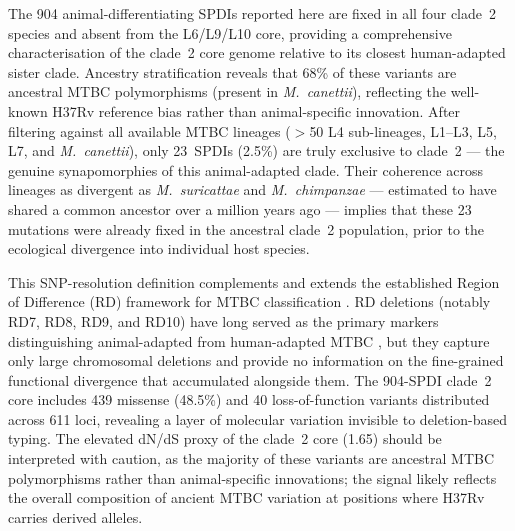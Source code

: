 \documentclass[11pt,a4paper]{article}
\newcommand{\Msur}{\textit{M.~suricattae}}
\newcommand{\Mchi}{\textit{M.~chimpanzae}}
\begin{document}
The 904 animal-differentiating SPDIs reported here are fixed in all four clade~2
species and absent from the L6/L9/L10 core, providing a comprehensive
characterisation of the clade~2 core genome relative to its closest
human-adapted sister clade.
%
Ancestry stratification reveals that 68\% of these variants are ancestral
MTBC polymorphisms (present in \textit{M.~canettii}), reflecting the
well-known H37Rv reference bias rather than animal-specific innovation.
%
After filtering against all available MTBC lineages ($>$50 L4 sub-lineages,
L1--L3, L5, L7, and \textit{M.~canettii}), only 23~SPDIs (2.5\%) are
truly exclusive to clade~2 --- the genuine synapomorphies of this
animal-adapted clade.
%
Their coherence across lineages as divergent as \Msur{} and \Mchi{} --- estimated
to have shared a common ancestor over a million years ago \cite{Boritsch2016} ---
implies that these 23 mutations were already fixed in the ancestral clade~2
population, prior to the ecological divergence into individual host species.

This SNP-resolution definition complements and extends the established
Region of Difference (RD) framework for MTBC classification \cite{Brosch2002}.
%
RD deletions (notably RD7, RD8, RD9, and RD10) have long served as the
primary markers distinguishing animal-adapted from human-adapted MTBC
\cite{Brosch2002, Mostowy2005}, but they capture only large chromosomal deletions
and provide no information on the fine-grained functional divergence that
accumulated alongside them.
%
The 904-SPDI clade~2 core includes 439 missense (48.5\%) and 40
loss-of-function variants distributed across 611 loci, revealing a layer of
molecular variation invisible to deletion-based typing.
%
The elevated dN/dS proxy of the clade~2 core (1.65) should be interpreted
with caution, as the majority of these variants are ancestral MTBC
polymorphisms rather than animal-specific innovations; the signal likely
reflects the overall composition of ancient MTBC variation at positions
where H37Rv carries derived alleles.
\end{document}
